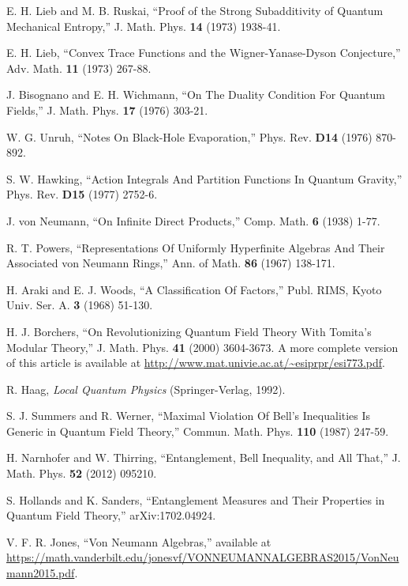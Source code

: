 \documentclass[12pt]{article}
\numberwithin{equation}{section}
\begin{document}
\begin{thebibliography}{99}
E. H. Lieb and M. B. Ruskai, ``Proof of the Strong Subadditivity of Quantum Mechanical Entropy,'' J. Math. Phys. {\bf 14} (1973) 
1938-41.

E. H. Lieb, ``Convex Trace Functions and the Wigner-Yanase-Dyson Conjecture,'' Adv. Math. {\bf 11} (1973) 267-88.

J. Bisognano and E. H. Wichmann, ``On The Duality Condition For Quantum Fields,'' J. Math. Phys. {\bf 17} (1976)
303-21.

W. G. Unruh, ``Notes On Black-Hole Evaporation,'' Phys. Rev. {\bf D14} (1976) 870-892.


S. W. Hawking, ``Action Integrals And Partition Functions In Quantum Gravity,'' Phys. Rev. {\bf D15} (1977) 2752-6.

J. von Neumann, ``On Infinite Direct Products,'' Comp. Math. {\bf 6} (1938) 1-77.

R. T. Powers, ``Representations Of Uniformly Hyperfinite Algebras And Their Associated von Neumann
Rings,'' Ann. of Math. {\bf 86} (1967) 138-171.

H. Araki and E. J. Woods, ``A Classification Of Factors,'' Publ. RIMS, Kyoto Univ. Ser. A. {\bf 3} (1968) 51-130.



  H. J. Borchers, ``On Revolutionizing Quantum Field Theory With Tomita's Modular Theory,''
J. Math. Phys. {\bf 41} (2000) 3604-3673.  A more complete version of this article is available at \url{http://www.mat.univie.ac.at/~esiprpr/esi773.pdf}.

R. Haag, {\it Local Quantum Physics} (Springer-Verlag, 1992).


S. J. Summers and R. Werner, ``Maximal Violation Of Bell's Inequalities Is Generic in Quantum Field Theory,'' Commun. Math. Phys. {\bf 110} (1987) 247-59.

H. Narnhofer and W. Thirring, ``Entanglement, Bell Inequality, and All That,'' J. Math. Phys. {\bf 52} (2012) 095210.



S. Hollands and K. Sanders, ``Entanglement Measures and Their Properties in Quantum Field Theory,'' arXiv:1702.04924.


V. F. R. Jones, ``Von Neumann Algebras,'' available at \url{https://math.vanderbilt.edu/jonesvf/VONNEUMANNALGEBRAS2015/VonNeumann2015.pdf}.




\end{thebibliography}
\end{document}
